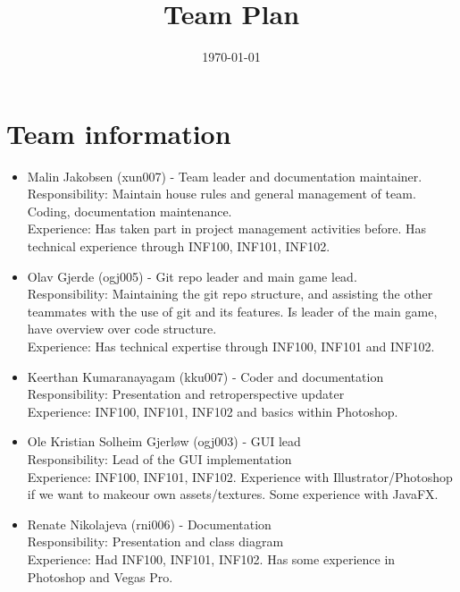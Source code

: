 \documentclass[12pt]{article}%
\begin{document}
\title{Team Plan}
\date{\today}
\maketitle
\section{Team information}




\begin{itemize}
\item Malin Jakobsen (xun007) - Team leader and documentation maintainer. \\
Responsibility: Maintain house rules and general management of team. Coding, documentation maintenance. \\
	Experience: Has taken part in project management activities before. Has technical
experience through INF100, INF101, INF102.

\item Olav Gjerde (ogj005) - Git repo leader and main game lead. \\
Responsibility: Maintaining the git repo structure, and assisting the other teammates
with the use of git and its features. Is leader of the main game, have overview over code structure. \\
Experience: Has technical expertise through INF100, INF101 and INF102.
\item Keerthan Kumaranayagam (kku007) -  Coder and documentation\\
Responsibility: Presentation and retroperspective updater\\
Experience: INF100, INF101, INF102 and basics within Photoshop.
\item Ole Kristian Solheim Gjerløw (ogj003) - GUI lead\\
Responsibility: Lead of the GUI implementation\\
Experience: INF100, INF101, INF102. Experience with Illustrator/Photoshop if we want to makeour own assets/textures. Some experience with JavaFX.
\item Renate Nikolajeva (rni006) - Documentation\\
Responsibility: Presentation and class diagram\\
	Experience: Had INF100, INF101, INF102. Has some experience in Photoshop and
Vegas Pro.


\end{itemize}
\end{document}
